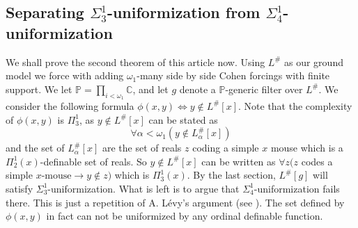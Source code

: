 \documentclass{article}
\theoremstyle{plain}
\theoremstyle{definition}
\newcommand{\forceP}{\mathbb{P}}
\newcommand{\Lsharp}{L^{\#}}
\begin{document}
\subsection{Separating $\Sigma^1_3$-uniformization from $\Sigma^1_4$-uniformization}
We shall prove the second theorem of this article now.
Using $\Lsharp$ as our ground model we force with adding $\omega_1$-many side by side Cohen forcings with finite support. We let $\forceP = \prod_{i < \omega_1} \mathbb{C}$, and let $g$ denote a $\forceP$-generic filter over $\Lsharp$.
We consider the following formula $\phi(x,y) \Leftrightarrow y \notin \Lsharp [x]$. Note that the complexity of $\phi(x,y)$ is $\Pi^1_3$, as $y \notin \Lsharp [x]$ can be stated as 
\[\forall \alpha < \omega_1 (y \notin \Lsharp_{\alpha} [x] ) \]
and the set of $\Lsharp_{\alpha} [x]$ are the set of reals $z$ coding a simple $x$ mouse which is a $\Pi^1_2 (x)$-definable set of reals. So $y \notin \Lsharp [x]$ can be written as $\forall z ( z $ codes a simple  $ x\text{-mouse} \rightarrow y \notin z)$
which is $\Pi^1_3 (x)$. By the last section, $\Lsharp [g]$ will satisfy $\Sigma^1_3$-uniformization. What is left is to argue that $\Sigma^1_4$-uniformization fails there. This is just a repetition of A. L\'{e}vy's argument (see \cite{levy1965definability}). The set defined by 
$\phi(x,y)$ in fact can not be uniformized by any ordinal definable function. 



\end{document}
